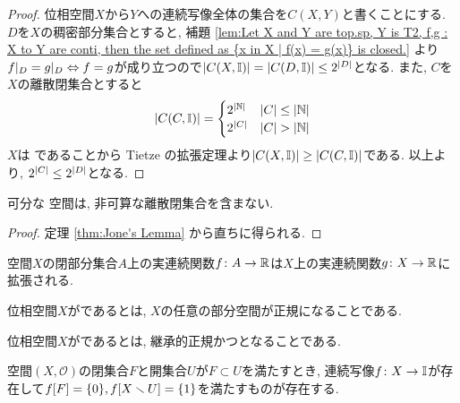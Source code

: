 \documentclass[uplatex, dvipdfmx, a4paper, 12pt, class=jsbook, crop=false]{standalone}
\begin{document}
\begin{proof}
	位相空間$ X $から$ Y $への連続写像全体の集合を$ C(X, Y) $と書くことにする. $ D $を$ X $の稠密部分集合とすると, 補題 \ref{lem:Let X and Y are top.sp, Y is T2, f,g : X to Y are conti, then the set defined as {x in X | f(x) = g(x)} is closed.} より$ f|_D = g|_D  \Leftrightarrow f =g $が成り立つので$ \left|C(X, \mathbb{I})\right| = \left|C(D, \mathbb{I})\right| \leq 2^{\left|D\right|} $となる. また, $ C $を$ X $の離散閉集合とすると
	$$ \left|C(C, \mathbb{I})\right| =\begin{cases}
	2^{\left|\mathbb{N}\right|} & \left|C\right| \leq \left|\mathbb{N}\right|\\
	2^{\left|C\right|} & \left|C\right| > \left|\mathbb{N}\right|
	\end{cases} $$
	$ X $は  であることから Tietze の拡張定理より$ \left|C(X, \mathbb{I})\right| \geq \left|C(C, \mathbb{I})\right| $である. 以上より, $ 2^{\left|C\right|} \leq 2^{\left|D\right|} $となる.
\end{proof}

\begin{corollary}
	\label{coro:Corollary of Jone's Lamma}
	可分な  空間は, 非可算な離散閉集合を含まない.
\end{corollary}

\begin{proof}
	定理 \ref{thm:Jone's Lemma} から直ちに得られる.
\end{proof}

\begin{theorem}[\Tietze]
	\label{thm:Tietze's extension theorem}
	 空間$ X $の閉部分集合$ A $上の実連続関数$ f \colon A \to \mathbb{R} $は$ X $上の実連続関数$ g \colon X \to \mathbb{R} $に拡張される.
\end{theorem}

\begin{definition}
	位相空間$ X $がであるとは, $ X $の任意の部分空間が正規になることである.
\end{definition}

\begin{definition}
	位相空間$ X $がであるとは, 継承的正規かつとなることである.
\end{definition}

\begin{theorem}
	\label{T400003}
	 空間\( (X, \mathcal{O}) \)の閉集合\( F \)と開集合\( U \)が\( F \subset U \)を満たすとき,
	連続写像\( f\colon X\to\mathbb{I} \)が存在して\( \mapset{f}{F} = \lrbrace{0},
	\mapset{f}{X \setminus U} = \lrbrace{1} \)を満たすものが存在する.
\end{theorem}
\end{document}
